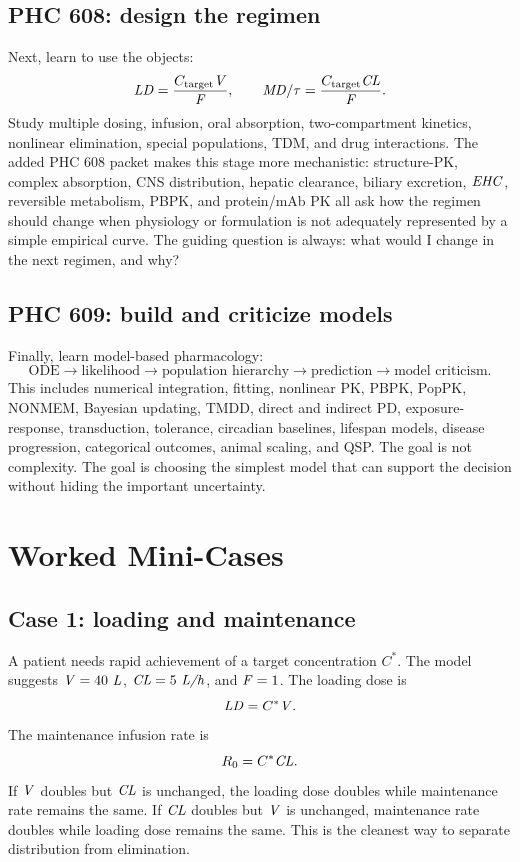 \documentclass[a4paper]{article}
\newcommand{\pkCL}{\pksym{CL}}
\newcommand{\pkV}{\pksym{V}}
\newcommand{\pkF}{\pksym{F}}
\newcommand{\pkEHC}{\pksym{EHC}}
\begin{document}
\subsection{PHC 608: design the regimen}

Next, learn to use the objects:
\[
  \pksym{LD}=\frac{C_{\pklab{target}}\pkV}{\pkF},
  \qquad
  \pksym{MD}/\tau=\frac{C_{\pklab{target}}\pkCL}{\pkF}.
\]
Study multiple dosing, infusion, oral absorption, two-compartment kinetics, nonlinear elimination, special populations, TDM, and drug interactions. The added PHC 608 packet makes this stage more mechanistic: structure-PK, complex absorption, CNS distribution, hepatic clearance, biliary excretion, \(\pkEHC\), reversible metabolism, PBPK, and protein/mAb PK all ask how the regimen should change when physiology or formulation is not adequately represented by a simple empirical curve. The guiding question is always: what would I change in the next regimen, and why?

\subsection{PHC 609: build and criticize models}

Finally, learn model-based pharmacology:
\[
  \text{ODE}
  \to
  \text{likelihood}
  \to
  \text{population hierarchy}
  \to
  \text{prediction}
  \to
  \text{model criticism}.
\]
This includes numerical integration, fitting, nonlinear PK, PBPK, PopPK, NONMEM, Bayesian updating, TMDD, direct and indirect PD, exposure-response, transduction, tolerance, circadian baselines, lifespan models, disease progression, categorical outcomes, animal scaling, and QSP. The goal is not complexity. The goal is choosing the simplest model that can support the decision without hiding the important uncertainty.

\section{Worked Mini-Cases}

\subsection{Case 1: loading and maintenance}

A patient needs rapid achievement of a target concentration \(C^*\). The model suggests \(\pkV=40\ \pksym{L}\), \(\pkCL=5\ \pksym{L/h}\), and \(\pkF=1\). The loading dose is
\[
  \pksym{LD}=C^*\pkV.
\]
The maintenance infusion rate is
\[
  R_0=C^*\pkCL.
\]
If \(\pkV\) doubles but \(\pkCL\) is unchanged, the loading dose doubles while maintenance rate remains the same. If \(\pkCL\) doubles but \(\pkV\) is unchanged, maintenance rate doubles while loading dose remains the same. This is the cleanest way to separate distribution from elimination.
\end{document}
